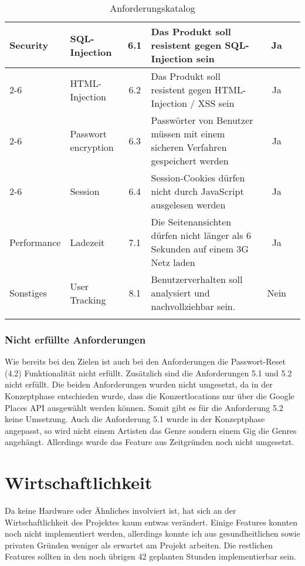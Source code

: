 \begin{longtable}[]{@{}p{1.9cm}p{2.5cm}cp{5.5cm}cc@{}}
  \midrule
  \multirow{9}{*}{Security}  & SQL-Injection              & 6.1          & Das Produkt soll resistent gegen SQL-Injection sein                                                         & Ja                              \\ \cline{2-6}
                             & HTML-Injection             & 6.2          & Das Produkt soll resistent gegen HTML-Injection / XSS sein                                                  & Ja                              \\ \cline{2-6}
                             & Passwort encryption        & 6.3          & Passwörter von Benutzer müssen mit einem sicheren Verfahren gespeichert werden                              & Ja                              \\ \cline{2-6}
                             & Session                    & 6.4          & Session-Cookies dürfen nicht durch JavaScript ausgelesen werden                                             & Ja                              \\
  \midrule
  Performance                & Ladezeit                   & 7.1          & Die Seitenansichten dürfen nicht länger als 6 Sekunden auf einem 3G Netz laden                              & Ja                              \\
  \midrule
  Sonstiges                  & User Tracking              & 8.1          & Benutzerverhalten soll analysiert und nachvollziehbar sein.                                                 & Nein                            \\
  \bottomrule
  \caption{Anforderungskatalog}
\end{longtable}

\subsubsection{Nicht erfüllte Anforderungen}

Wie bereits bei den Zielen ist auch bei den Anforderungen die Passwort-Reset (4.2)
Funktionalität nicht erfüllt.
Zusätzlich sind die Anforderungen 5.1 und 5.2 nicht erfüllt. Die beiden
Anforderungen wurden nicht umgesetzt, da in der Konzeptphase entschieden wurde,
dass die Konzertlocations nur über die Google Places API ausgewählt werden können.
Somit gibt es für die Anforderung 5.2 keine Umsetzung.
Auch die Anforderung 5.1 wurde in der Konzeptphase angepasst, so wird nicht einem
Artisten das Genre sondern einem Gig die Genres angehängt. Allerdings wurde das
Feature aus Zeitgründen noch nicht umgesetzt.

\section{Wirtschaftlichkeit}

Da keine Hardware oder Ähnliches involviert ist, hat sich an der
Wirtschaftlichkeit des Projektes kaum entwas verändert.
Einige Features konnten noch nicht implementiert werden, allerdings
konnte ich aus gesundheitlichen sowie privaten Gründen weniger als
erwartet am Projekt arbeiten.
Die restlichen Features sollten in den noch übrigen 42 geplanten
Stunden implementierbar sein.
